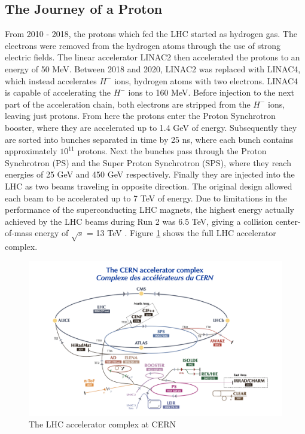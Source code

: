  \subsection{The Journey of a Proton}
 \label{sec:proton_journey}
From 2010 - 2018, the protons which fed the LHC started as hydrogen gas. The electrons were removed from the hydrogen atoms through the use of strong electric fields. The linear accelerator LINAC2 then accelerated the protons to an energy of 50 MeV. Between 2018 and 2020, LINAC2 was replaced with LINAC4, which instead accelerates $H^{-}$ ions, hydrogen atoms with two electrons. LINAC4 is capable of accelerating the $H^-$ ions to 160 MeV. Before injection to the next part of the acceleration chain, both electrons are stripped from the $H^-$ ions, leaving just protons. From here the protons enter the Proton Synchrotron booster, where they are accelerated up to 1.4 GeV of energy. Subsequently they are sorted into bunches separated in time by 25 ns, where each bunch contains approximately $10^{11}$ protons. Next the bunches pass through the Proton Synchrotron (PS) and the Super Proton Synchrotron (SPS), where they reach energies of 25 GeV and 450 GeV respectively. Finally they are injected into the LHC as two beams traveling in opposite direction. The original design allowed each beam to be accelerated up to 7 TeV of energy. Due to limitations in the performance of the superconducting LHC magnets, the highest energy actually achieved by the LHC beams during Run 2 was 6.5 TeV, giving a collision center-of-mass energy of $\sqrt{s}$ = 13 TeV \cite{lhc_faq}. Figure \ref{fig:accelerator_complex} shows the full LHC accelerator complex.\par

\begin{figure}
	\includegraphics[width=\textwidth]{figures/ch3/accelerator_complex.png}
	\caption{The LHC accelerator complex at CERN \cite{cern_accelerator_complex}}
	\label{fig:accelerator_complex}
\end{figure}

